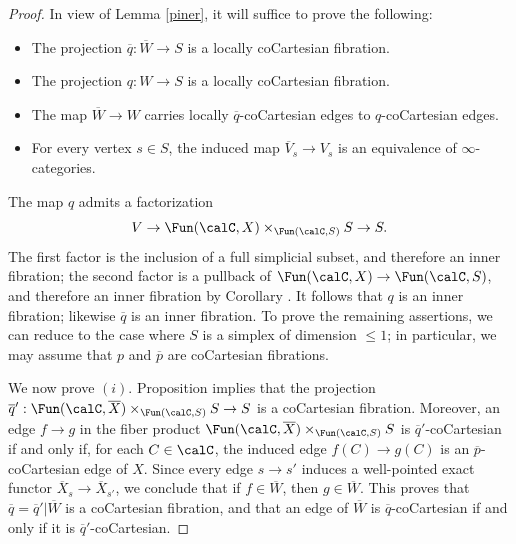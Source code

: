 \begin{proof}
In view of Lemma \ref{piner}, it will suffice to prove the following:
\begin{itemize}
\item[$(i)$] The projection $\overline{q}: \overline{W} \rightarrow S$ is a locally coCartesian fibration.
\item[$(ii)$] The projection $q: W \rightarrow S$ is a locally coCartesian fibration.
\item[$(iii)$] The map $\overline{W} \rightarrow W$ carries locally $\overline{q}$-coCartesian
edges to $q$-coCartesian edges.
\item[$(iv)$] For every vertex $s \in S$, the induced map $\overline{V}_s \rightarrow V_{s}$
is an equivalence of $\infty$-categories.
\end{itemize}
The map $q$ admits a factorization
$$ V \rightarrow \Fun( \calC, X) \times_{ \Fun(\calC,S)} S \rightarrow S.$$
The first factor is the inclusion of a full simplicial subset, and therefore an inner fibration;
the second factor is a pullback of $\Fun(\calC,X) \rightarrow \Fun(\calC, S)$,
and therefore an inner fibration by Corollary . It follows that
$q$ is an inner fibration; likewise $\overline{q}$ is an inner fibration. To prove
the remaining assertions, we can reduce to the case where $S$ is a simplex of
dimension $\leq 1$; in particular, we may assume that $p$ and $\overline{p}$ are coCartesian
fibrations.

We now prove $(i)$. Proposition  implies that the projection
$\overline{q}': \Fun( \calC, \overline{X}) \times_{ \Fun(\calC, S) } S \rightarrow S$
is a coCartesian fibration. Moreover, an edge $f \rightarrow g$ in the fiber 
product $\Fun( \calC, \overline{X}) \times_{ \Fun(\calC, S) } S$ is
$\overline{q}'$-coCartesian if and only if, for each $C \in \calC$, the induced edge
$f(C) \rightarrow g(C)$ is an $\overline{p}$-coCartesian edge of $X$. 
Since every edge $s \rightarrow s'$ induces a well-pointed exact functor
$\overline{X}_s \rightarrow \overline{X}_{s'}$, we conclude that
if $f \in \overline{W}$, then $g \in \overline{W}$. This proves that
$\overline{q} = \overline{q}' | \overline{W}$ is a coCartesian fibration, and that
an edge of $\overline{W}$ is $\overline{q}$-coCartesian if and only if it is
$\overline{q}'$-coCartesian.


\end{proof}
